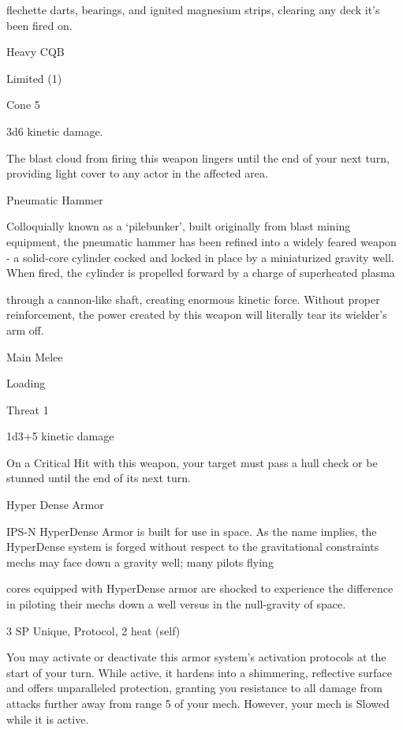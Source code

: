 flechette darts, bearings, and ignited magnesium strips, clearing any deck it’s been fired on.

Heavy CQB

Limited (1)

Cone 5

3d6 kinetic damage.

The blast cloud from firing this weapon lingers until the end of your next turn, providing light
cover to any actor in the affected area.


Pneumatic Hammer

Colloquially known as a ‘pilebunker’, built originally from blast mining equipment, the pneumatic hammer
has been refined into a widely feared weapon - a solid-core cylinder cocked and locked in place by a
miniaturized gravity well. When fired, the cylinder is propelled forward by a charge of superheated plasma

through a cannon-like shaft, creating enormous kinetic force. Without proper reinforcement, the power
created by this weapon will literally tear its wielder’s arm off.

Main Melee

Loading

Threat 1

1d3+5 kinetic damage

On a Critical Hit with this weapon, your target must pass a hull check or be stunned until the end
of its next turn.





Hyper Dense Armor

IPS-N HyperDense Armor is built for use in space. As the name implies, the HyperDense system is forged
without respect to the gravitational constraints mechs may face down a gravity well; many pilots flying

cores equipped with HyperDense armor are shocked to experience the difference in piloting their mechs
down a well versus in the null-gravity of space.

3 SP
Unique, Protocol, 2 heat (self)

You may activate or deactivate this armor system’s activation protocols at the start of your turn.
While active, it hardens into a shimmering, reflective surface and offers unparalleled protection,
granting you resistance to all damage from attacks further away from range 5 of your mech.
However, your mech is Slowed while it is active.
